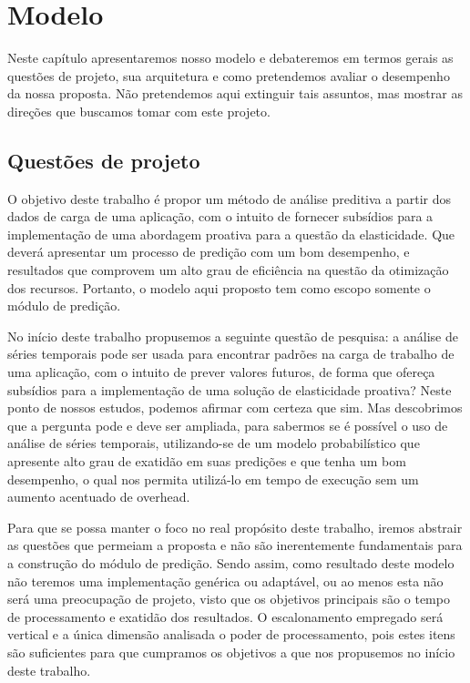 \documentclass[twoside,english,brazilian]{UNISINOSmonografia}
\begin{document}
\chapter{Modelo}

Neste capítulo apresentaremos nosso modelo e debateremos em termos gerais as questões de projeto, sua arquitetura e como pretendemos avaliar o desempenho da nossa proposta. Não pretendemos aqui extinguir tais assuntos, mas mostrar as direções que buscamos tomar com este projeto.

\section{Questões de projeto}
O objetivo deste trabalho é propor um método de análise preditiva a partir dos dados de carga de uma aplicação, com o intuito de fornecer subsídios para a implementação de uma abordagem proativa para a questão da elasticidade. Que deverá apresentar um processo de predição com um bom desempenho, e resultados que comprovem um alto grau de eficiência na questão da otimização dos recursos. Portanto, o modelo aqui proposto tem como escopo somente o módulo de predição.

No início deste trabalho propusemos a seguinte questão de pesquisa: a análise de séries temporais pode ser usada para encontrar padrões na carga de trabalho de uma aplicação, com o intuito de prever valores futuros, de forma que ofereça subsídios para a implementação de uma solução de elasticidade proativa? Neste ponto de nossos estudos, podemos afirmar com certeza que sim. Mas descobrimos que a pergunta pode e deve ser ampliada, para sabermos se é possível o uso de análise de séries temporais, utilizando-se de um modelo probabilístico que apresente alto grau de exatidão em suas predições e que tenha um bom desempenho, o qual nos permita utilizá-lo em tempo de execução sem um aumento acentuado de overhead.

Para que se possa manter o foco no real propósito deste trabalho, iremos abstrair as questões que permeiam a proposta e não são inerentemente fundamentais para a construção do módulo de predição. Sendo assim, como resultado deste modelo não teremos uma implementação genérica ou adaptável, ou ao menos esta não será uma preocupação de projeto, visto que os objetivos principais são o tempo de processamento e exatidão dos resultados. O escalonamento empregado será vertical e a única dimensão analisada o poder de processamento, pois estes itens são suficientes para que cumpramos os objetivos a que nos propusemos no início deste trabalho. 
\end{document}
